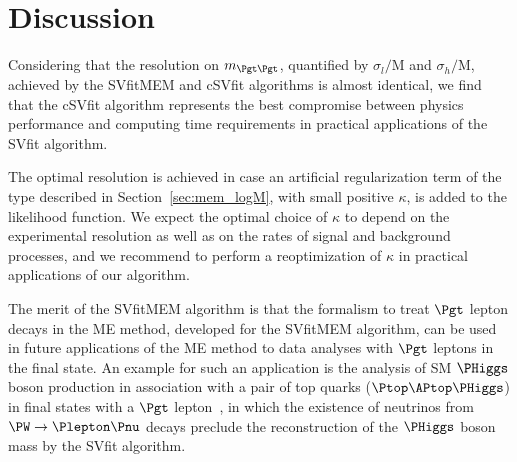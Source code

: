 \section{Discussion}
\label{sec:discussion}

Considering that the resolution on $m_{\Pgt\Pgt}$,
quantified by $\sigma_{l}/\textrm{M}$ and $\sigma_{h}/\textrm{M}$, achieved
by the SVfitMEM and cSVfit algorithms is almost identical, we find that the cSVfit
algorithm represents the best compromise between physics performance and computing time requirements in practical applications of the SVfit algorithm.

The optimal resolution is achieved in case an artificial regularization term of the type described in Section~\ref{sec:mem_logM}, with small positive $\kappa$,
is added to the likelihood function.
We expect the optimal choice of $\kappa$ to depend on the experimental resolution
as well as on the rates of signal and background processes,
and we recommend to perform a reoptimization of $\kappa$ in practical applications of our algorithm.

The merit of the SVfitMEM algorithm is that the 
formalism to treat $\Pgt$ lepton decays in the ME method, developed
for the SVfitMEM algorithm, can be used
in future applications of the ME method to data analyses with $\Pgt$
leptons in the final state.
An example for such an application is the analysis of SM $\PHiggs$ boson production in association with a pair of top quarks ($\Ptop\APtop\PHiggs$)
in final states with a $\Pgt$ lepton~\cite{HIG-17-003},
in which the existence of neutrinos from $\PW \to \Plepton\Pnu$ decays preclude the reconstruction of the $\PHiggs$ boson mass by the SVfit algorithm.

